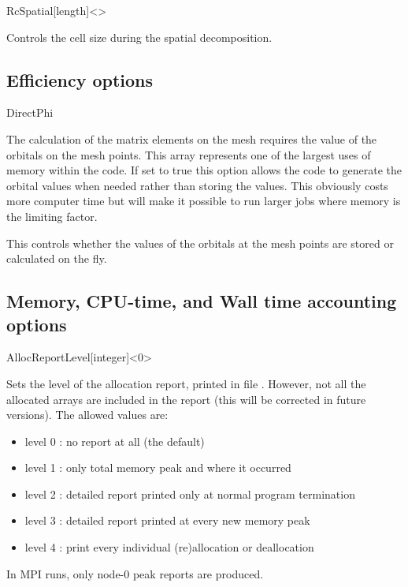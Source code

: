 \begin{fdfentry}{RcSpatial}[length]<>
  
  Controls the cell size during the spatial decomposition.

\end{fdfentry}


\subsection{Efficiency options}

\begin{fdflogicalF}{DirectPhi}

  The calculation of the matrix elements on the mesh requires the
  value of the orbitals on the mesh points. This array represents one
  of the largest uses of memory within the code. If set to true this
  option allows the code to generate the orbital values when needed
  rather than storing the values. This obviously costs more computer
  time but will make it possible to run larger jobs where memory is
  the limiting factor.

  This controls whether the values of the orbitals at the mesh points
  are stored or calculated on the fly.
  
\end{fdflogicalF}


\subsection{Memory, CPU-time, and Wall time accounting options}

\begin{fdfentry}{AllocReportLevel}[integer]<$0$>

  Sets the level of the allocation report, printed in file
  . However, not all the allocated arrays are included
  in the report (this will be corrected in future versions). The
  allowed values are:
  \begin{itemize}
    \item%
    level 0 : no report at all (the default)
    \item%
    level 1 : only total memory peak and where it occurred
    \item%
    level 2 : detailed report printed only at
    normal program termination
    \item%
    level 3 : detailed report printed at every new memory peak
    \item%
    level 4 : print every individual (re)allocation or deallocation
  \end{itemize}

  \note In MPI runs, only node-0 peak reports are produced.
  
\end{fdfentry}


